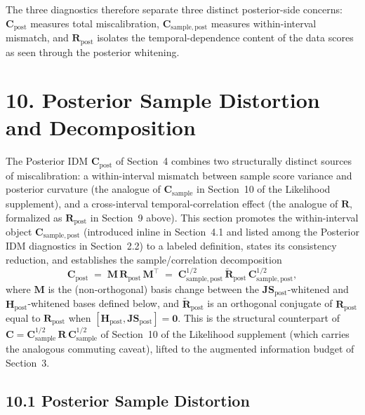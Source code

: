 \documentclass[11pt]{article}
\begin{document}
The three diagnostics therefore separate three distinct posterior-side concerns: $\mathbf C_{\mathrm{post}}$ measures total miscalibration, $\mathbf C_{\mathrm{sample},\mathrm{post}}$ measures within-interval mismatch, and $\mathbf R_{\mathrm{post}}$ isolates the temporal-dependence content of the data scores as seen through the posterior whitening.

\section*{10. Posterior Sample Distortion and Decomposition}

The Posterior IDM $\mathbf C_{\mathrm{post}}$ of Section~4 combines two structurally distinct sources of miscalibration: a within-interval mismatch between sample score variance and posterior curvature (the analogue of $\mathbf C_{\mathrm{sample}}$ in Section~10 of the Likelihood supplement), and a cross-interval temporal-correlation effect (the analogue of $\mathbf R$, formalized as $\mathbf R_{\mathrm{post}}$ in Section~9 above). This section promotes the within-interval object $\mathbf C_{\mathrm{sample},\mathrm{post}}$ (introduced inline in Section~4.1 and listed among the Posterior IDM diagnostics in Section~2.2) to a labeled definition, states its consistency reduction, and establishes the sample/correlation decomposition
\begin{equation}
\mathbf C_{\mathrm{post}}
\;=\;
\mathbf M\,
\mathbf R_{\mathrm{post}}\,
\mathbf M^\top
\;=\;
\mathbf C_{\mathrm{sample},\mathrm{post}}^{1/2}\,
\widetilde{\mathbf R}_{\mathrm{post}}\,
\mathbf C_{\mathrm{sample},\mathrm{post}}^{1/2},
\label{eq:posterior-c-decomposition}
\end{equation}
where $\mathbf M$ is the (non-orthogonal) basis change between the $\mathbf{JS}_{\mathrm{post}}$-whitened and $\mathbf H_{\mathrm{post}}$-whitened bases defined below, and $\widetilde{\mathbf R}_{\mathrm{post}}$ is an orthogonal conjugate of $\mathbf R_{\mathrm{post}}$ equal to $\mathbf R_{\mathrm{post}}$ when $[\mathbf H_{\mathrm{post}}, \mathbf{JS}_{\mathrm{post}}] = \mathbf 0$. This is the structural counterpart of $\mathbf C = \mathbf C_{\mathrm{sample}}^{1/2}\,\mathbf R\,\mathbf C_{\mathrm{sample}}^{1/2}$ of Section~10 of the Likelihood supplement (which carries the analogous commuting caveat), lifted to the augmented information budget of Section~3.

\subsection*{10.1 Posterior Sample Distortion}
\end{document}
